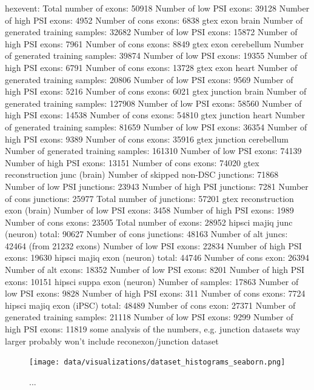 hexevent:
Total number of exons: 50918
Number of low PSI exons: 39128
Number of high PSI exons: 4952
Number of cons exons: 6838
gtex exon brain
Number of generated training samples: 32682
Number of low PSI exons: 15872
Number of high PSI exons: 7961
Number of cons exons: 8849
gtex exon cerebellum
Number of generated training samples: 39874
Number of low PSI exons: 19355
Number of high PSI exons: 6791
Number of cons exons: 13728
gtex exon heart
Number of generated training samples: 20806
Number of low PSI exons: 9569
Number of high PSI exons: 5216
Number of cons exons: 6021
gtex junction brain
Number of generated training samples: 127908
Number of low PSI exons: 58560
Number of high PSI exons: 14538
Number of cons exons: 54810
gtex junction heart
Number of generated training samples: 81659
Number of low PSI exons: 36354
Number of high PSI exons: 9389
Number of cons exons: 35916
gtex junction cerebellum
Number of generated training samples: 161310
Number of low PSI exons: 74139
Number of high PSI exons: 13151
Number of cons exons: 74020
gtex reconstruction junc (brain)
Number of skipped non-DSC junctions: 71868
Number of low PSI junctions: 23943
Number of high PSI junctions: 7281
Number of cons junctions: 25977
Total number of junctions: 57201
gtex reconstruction exon (brain)
Number of low PSI exons: 3458
Number of high PSI exons: 1989
Number of cons exons: 23505
Total number of exons: 28952
hipsci majiq junc (neuron)
total: 90627
Number of cons junctions: 48163
Number of alt juncs: 42464 (from 21232 exons)
Number of low PSI exons: 22834
Number of high PSI exons: 19630
hipsci majiq exon (neuron)
total: 44746
Number of cons exon: 26394
Number of alt exons: 18352
Number of low PSI exons: 8201
Number of high PSI exons: 10151
hipsci suppa exon (neuron)
Number of samples: 17863
Number of low PSI exons: 9828
Number of high PSI exons: 311
Number of cons exons: 7724
hipsci majiq exon (iPSC)
total: 48489
Number of cons exon: 27371
Number of generated training samples: 21118
Number of low PSI exons: 9299
Number of high PSI exons: 11819
some analysis of the numbers, e.g. junction datasets way larger
probably won't include reconexon/junction dataset

\begin{figure}
	\centering\texttt{[image: data/visualizations/dataset\_histograms\_seaborn.png]} 
	\caption[test.]{
		...
	}
	\label{fig:datahistograms}
\end{figure}

